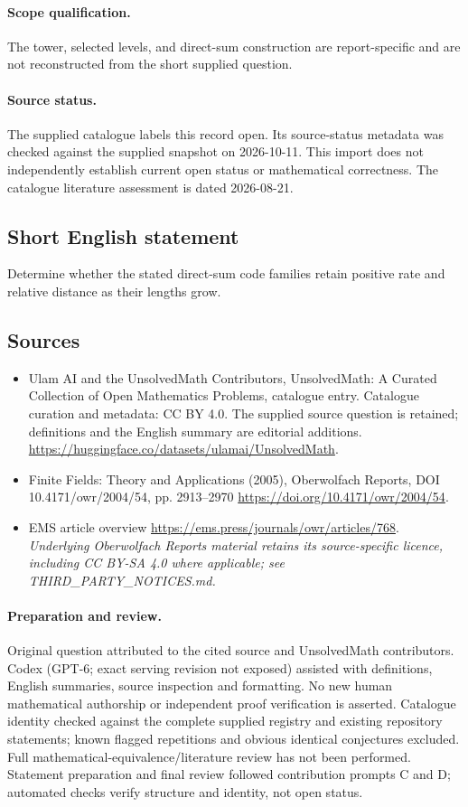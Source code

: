 \documentclass[11pt]{article}
\begin{document}
\paragraph{Scope qualification.}
The tower, selected levels, and direct-sum construction are report-specific and are not reconstructed from the short supplied question.
\paragraph{Source status.}
The supplied catalogue labels this record open. Its source-status metadata was checked against the supplied snapshot on 2026-10-11. This import does not independently establish current open status or mathematical correctness. The catalogue literature assessment is dated 2026-08-21.
\subsection{Short English statement}
Determine whether the stated direct-sum code families retain positive rate and relative distance as their lengths grow.
\subsection{Sources}
\begin{itemize}
\item[S1] Ulam AI and the UnsolvedMath Contributors, UnsolvedMath: A Curated Collection of Open Mathematics Problems, catalogue entry. Catalogue curation and metadata: CC BY 4.0. The supplied source question is retained; definitions and the English summary are editorial additions.
\url{https://huggingface.co/datasets/ulamai/UnsolvedMath}.
\item[S2] Finite Fields: Theory and Applications (2005), Oberwolfach Reports, DOI 10.4171/owr/2004/54, pp. 2913--2970
\url{https://doi.org/10.4171/owr/2004/54}.
\item[S3] EMS article overview
\url{https://ems.press/journals/owr/articles/768}.
\textit{Underlying Oberwolfach Reports material retains its source-specific licence, including CC BY-SA 4.0 where applicable; see THIRD\_PARTY\_NOTICES.md.}
\end{itemize}
\paragraph{Preparation and review.}
Original question attributed to the cited source and UnsolvedMath contributors. Codex (GPT-6; exact serving revision not exposed) assisted with definitions, English summaries, source inspection and formatting. No new human mathematical authorship or independent proof verification is asserted. Catalogue identity checked against the complete supplied registry and existing repository statements; known flagged repetitions and obvious identical conjectures excluded. Full mathematical-equivalence/literature review has not been performed. Statement preparation and final review followed contribution prompts C and D; automated checks verify structure and identity, not open status.
\label{end:statement}
\end{document}
